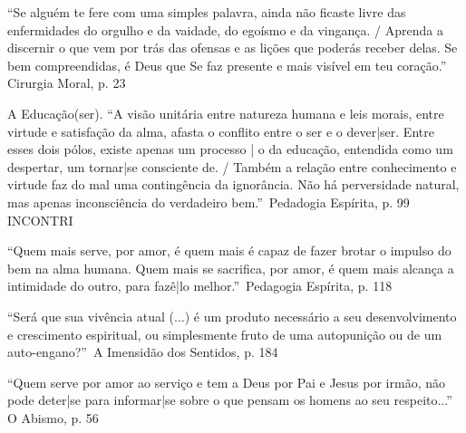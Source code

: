 \documentclass[12pt,a4paper]{article}
\begin{document}
			\begin{flushright}
			\end{flushright}

\textquotedblleft Se algu\'em te fere com uma simples palavra, ainda n\~ao ficaste livre das enfermidades do orgulho e da vaidade, do ego\'ismo e da vingan\c{c}a. / Aprenda a discernir o que vem por tr\'as das ofensas e as li\c{c}\~oes que poder\'as receber delas. Se bem compreendidas, \'e Deus que Se faz presente e mais vis\'ivel em teu cora\c{c}\~ao.\textquotedblright\, Cirurgia Moral, p. 23

			\begin{flushright}
			\end{flushright}

A Educa\c{c}\~ao(ser). \textquotedblleft A vis\~ao unit\'aria entre natureza humana e leis morais, entre virtude e satisfa\c{c}\~ao da alma, afasta o conflito entre o ser e o dever|ser. Entre esses dois p\'olos, existe apenas um processo | o da educa\c{c}\~ao, entendida como um despertar, um tornar|se consciente de. / Tamb\'em a rela\c{c}\~ao entre conhecimento e virtude faz do mal uma conting\^encia da ignor\^ancia. N\~ao h\'a perversidade natural, mas apenas inconsci\^encia\cite{Freud} do verdadeiro bem.\textquotedblright\, Pedadogia Esp\'irita, p. 99 INCONTRI

			\begin{flushright}
			\end{flushright}

\textquotedblleft Quem mais serve, por amor, \'e quem mais \'e capaz de fazer brotar o impulso do bem na alma humana. Quem mais se sacrifica, por amor, \'e quem mais alcan\c{c}a a intimidade do outro, para faz\^e|lo melhor.\textquotedblright\, Pedagogia Esp\'irita, p. 118

			\begin{flushright}
			\end{flushright}

\textquotedblleft Ser\'a que sua viv\^encia atual (...) \'e um produto necess\'ario a seu desenvolvimento e crescimento espiritual, ou simplesmente fruto de uma autopuni\c{c}\~ao ou de um auto-engano?\textquotedblright\, A Imensid\~ao dos Sentidos, p. 184

			\begin{flushright}
			\end{flushright}

\textquotedblleft Quem serve por amor ao servi\c{c}o e tem a Deus por Pai e Jesus por irm\~ao, n\~ao pode deter|se para informar|se sobre o que pensam os homens ao seu respeito...\textquotedblright\, O Abismo, p. 56
\end{document}
